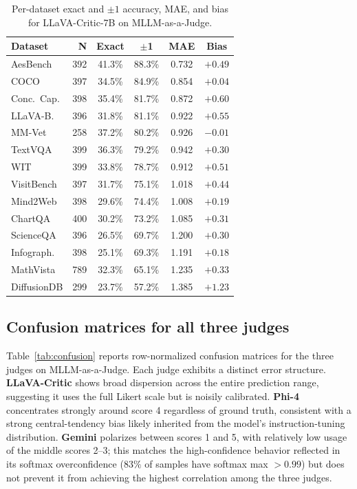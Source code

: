 \documentclass{article}
\begin{document}
\begin{table}[t]
\centering
\caption{Per-dataset exact and $\pm 1$ accuracy, MAE, and bias for LLaVA-Critic-7B on MLLM-as-a-Judge.}
\label{tab:relaxed_accuracy}
\small
\begin{tabular}{lrcccc}
\toprule
\textbf{Dataset} & \textbf{N} & \textbf{Exact} & $\pm$\textbf{1} & \textbf{MAE} & \textbf{Bias} \\
\midrule
AesBench & 392 & 41.3\% & 88.3\% & 0.732 & $+0.49$ \\
COCO & 397 & 34.5\% & 84.9\% & 0.854 & $+0.04$ \\
Conc.\ Cap. & 398 & 35.4\% & 81.7\% & 0.872 & $+0.60$ \\
LLaVA-B. & 396 & 31.8\% & 81.1\% & 0.922 & $+0.55$ \\
MM-Vet & 258 & 37.2\% & 80.2\% & 0.926 & $-0.01$ \\
TextVQA & 399 & 36.3\% & 79.2\% & 0.942 & $+0.30$ \\
WIT & 399 & 33.8\% & 78.7\% & 0.912 & $+0.51$ \\
VisitBench & 397 & 31.7\% & 75.1\% & 1.018 & $+0.44$ \\
Mind2Web & 398 & 29.6\% & 74.4\% & 1.008 & $+0.19$ \\
ChartQA & 400 & 30.2\% & 73.2\% & 1.085 & $+0.31$ \\
ScienceQA & 396 & 26.5\% & 69.7\% & 1.200 & $+0.30$ \\
Infograph. & 398 & 25.1\% & 69.3\% & 1.191 & $+0.18$ \\
MathVista & 789 & 32.3\% & 65.1\% & 1.235 & $+0.33$ \\
DiffusionDB & 299 & 23.7\% & 57.2\% & 1.385 & $+1.23$ \\
\bottomrule
\end{tabular}
\end{table}

\subsection{Confusion matrices for all three judges}
\label{app:confusion}

Table~\ref{tab:confusion} reports row-normalized confusion matrices for the three judges on MLLM-as-a-Judge. Each judge exhibits a distinct error structure. \textbf{LLaVA-Critic} shows broad dispersion across the entire prediction range, suggesting it uses the full Likert scale but is noisily calibrated. \textbf{Phi-4} concentrates strongly around score 4 regardless of ground truth, consistent with a strong central-tendency bias likely inherited from the model's instruction-tuning distribution. \textbf{Gemini} polarizes between scores 1 and 5, with relatively low usage of the middle scores 2--3; this matches the high-confidence behavior reflected in its softmax overconfidence ($83\%$ of samples have softmax max $> 0.99$) but does not prevent it from achieving the highest correlation among the three judges.
\end{document}
